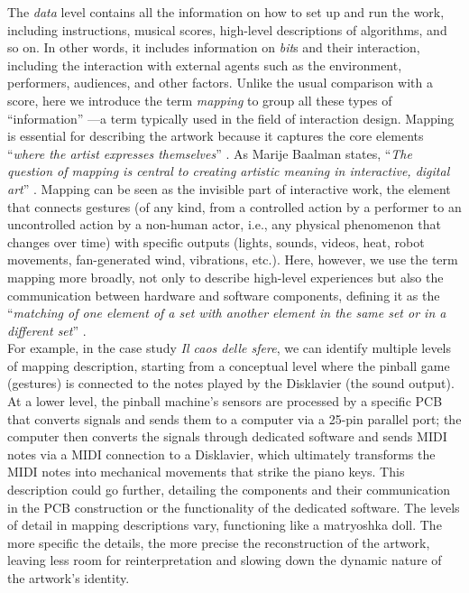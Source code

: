 The \textit{data} level contains all the information on how to set up and run the work, including instructions, musical scores, high-level descriptions of algorithms, and so on. In other words, it includes information on \textit{bit}s and their interaction, including the interaction with external agents such as the environment, performers, audiences, and other factors. Unlike the usual comparison with a score, here we introduce the term \textit{mapping} to group all these types of ``information'' —a term typically used in the field of interaction design. Mapping is essential for describing the artwork because it captures the core elements ``\textit{where the artist expresses themselves}'' \cite{baalman2022composing}. As Marije Baalman states, ``\textit{The question of mapping is central to creating artistic meaning in interactive, digital art}'' \cite{baalman2022composing}. Mapping can be seen as the invisible part \cite{delahunta2001invisibility} of interactive work, the element that connects gestures (of any kind, from a controlled action by a performer to an uncontrolled action by a non-human actor, i.e., any physical phenomenon that changes over time) with specific outputs (lights, sounds, videos, heat, robot movements, fan-generated wind, vibrations, etc.). Here, however, we use the term mapping more broadly, not only to describe high-level experiences but also the communication between hardware and software components, defining it as the ``\textit{matching of one element of a set with another element in the same set or in a different set}'' \cite{winkler2001composing}.\\
For example, in the case study \textit{Il caos delle sfere}, we can identify multiple levels of mapping description, starting from a conceptual level where the pinball game (gestures) is connected to the notes played by the Disklavier (the sound output). At a lower level, the pinball machine's sensors are processed by a specific PCB that converts signals and sends them to a computer via a 25-pin parallel port; the computer then converts the signals through dedicated software and sends MIDI notes via a MIDI connection to a Disklavier, which ultimately transforms the MIDI notes into mechanical movements that strike the piano keys. This description could go further, detailing the components and their communication in the PCB construction or the functionality of the dedicated software. The levels of detail in mapping descriptions vary, functioning like a matryoshka doll. The more specific the details, the more precise the reconstruction of the artwork, leaving less room for reinterpretation and slowing down the dynamic nature of the artwork's identity.\\
